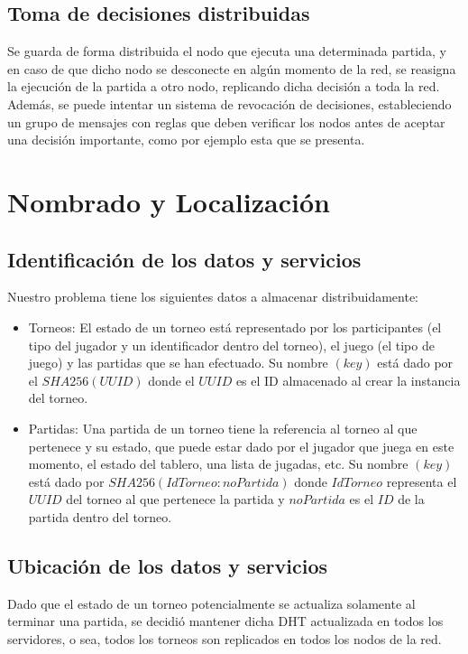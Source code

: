 \documentclass{article}
\begin{document}
\subsection{Toma de decisiones distribuidas}
Se guarda de forma distribuida el nodo que ejecuta una determinada partida, y en caso de que dicho nodo se desconecte en algún momento de la red, se reasigna la ejecución de la partida a otro nodo, replicando dicha decisión a toda la red. Además, se puede intentar un sistema de revocación de decisiones, estableciendo un grupo de mensajes con reglas que deben verificar los nodos antes de aceptar una decisión importante, como por ejemplo esta que se presenta.

\section{Nombrado y Localización}
\subsection{Identificación de los datos y servicios}
Nuestro problema tiene los siguientes datos a almacenar distribuidamente:
\begin{itemize}
\item{Torneos:} El estado de un torneo está representado por los participantes (el tipo del jugador y un identificador dentro del torneo), el juego (el tipo de juego) y las partidas que se han efectuado. Su nombre $(key)$ está dado por el $SHA256(UUID)$ donde el $UUID$ es el ID almacenado al crear la instancia del torneo.
\item{Partidas:} Una partida de un torneo tiene la referencia al torneo al que pertenece y su estado, que puede estar dado por el jugador que juega en este momento, el estado del tablero, una lista de jugadas, etc. Su nombre $(key)$ está dado por $SHA256(IdTorneo:noPartida)$ donde $IdTorneo$ representa el $UUID$ del torneo al que pertenece la partida y $noPartida$ es el $ID$ de la partida dentro del torneo.
\end{itemize}

\subsection{Ubicación de los datos y servicios}
Dado que el estado de un torneo potencialmente se actualiza solamente al terminar una partida, se decidió mantener dicha DHT actualizada en todos los servidores, o sea, todos los torneos son replicados en todos los nodos de la red.
\end{document}
